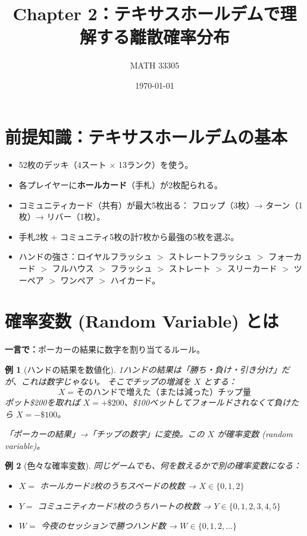 \documentclass{article}
\title{Chapter 2：テキサスホールデムで理解する離散確率分布}
\author{MATH 33305}
\date{\today}
\newtheorem{example}{例}[section]
\theoremstyle{remark}
\begin{document}
\maketitle
\tableofcontents
\newpage

\section*{前提知識：テキサスホールデムの基本}

\begin{itemize}
  \item 52枚のデッキ（4スート $\times$ 13ランク）を使う。
  \item 各プレイヤーに\textbf{ホールカード}（手札）が2枚配られる。
  \item コミュニティカード（共有）が最大5枚出る：
        フロップ（3枚）→ ターン（1枚）→ リバー（1枚）。
  \item 手札2枚 + コミュニティ5枚の計7枚から最強の5枚を選ぶ。
  \item ハンドの強さ：ロイヤルフラッシュ $>$ ストレートフラッシュ $>$ フォーカード $>$ フルハウス $>$ フラッシュ $>$ ストレート $>$ スリーカード $>$ ツーペア $>$ ワンペア $>$ ハイカード。
\end{itemize}

\newpage

\section{確率変数 (Random Variable) とは}

\textbf{一言で：}ポーカーの結果に数字を割り当てるルール。

\begin{example}[ハンドの結果を数値化]
  1ハンドの結果は「勝ち・負け・引き分け」だが、これは数字じゃない。
  そこでチップの増減を $X$ とする：
  \[
    X = \text{そのハンドで増えた（または減った）チップ量}
  \]
  ポット\$200を取れば $X = +\$200$、\$100ベットしてフォールドされなくて負けたら $X = -\$100$。

  「ポーカーの結果」→「チップの数字」に変換。この $X$ が確率変数 (random variable)。
\end{example}

\begin{example}[色々な確率変数]
  同じゲームでも、何を数えるかで別の確率変数になる：
  \begin{itemize}
    \item $X =$ ホールカード2枚のうちスペードの枚数 → $X \in \{0, 1, 2\}$
    \item $Y =$ コミュニティカード5枚のうちハートの枚数 → $Y \in \{0, 1, 2, 3, 4, 5\}$
    \item $W =$ 今夜のセッションで勝つハンド数 → $W \in \{0, 1, 2, \ldots\}$
  \end{itemize}
\end{example}
\end{document}

